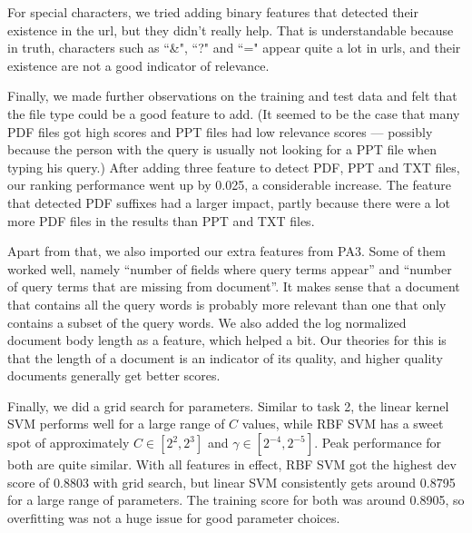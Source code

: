 \documentclass[10pt,twocolumn]{article}
\begin{document}
For special characters, we tried adding binary features that detected their existence in the url, but they didn't really help. That is understandable because in truth, characters such as ``\&", ``?" and ``=" appear quite a lot in urls, and their existence are not a good indicator of relevance.

Finally, we made further observations on the training and test data and felt that the file type could be a good feature to add. (It seemed to be the case that many PDF files got high scores and PPT files had low relevance scores --- possibly because the person with the query is usually not looking for a PPT file when typing his query.) After adding three feature to detect PDF, PPT and TXT files, our ranking performance went up by 0.025, a considerable increase. The feature that detected PDF suffixes had a larger impact, partly because there were a lot more PDF files in the results than PPT and TXT files.

Apart from that, we also imported our extra features from PA3. Some of them worked well, namely ``number of fields where query terms appear'' and ``number of query terms that are missing from document''. It makes sense that a document that contains all the query words is probably more relevant than one that only contains a subset of the query words. We also added the log normalized document body length as a feature, which helped a bit. Our theories for this is that the length of a document is an indicator of its quality, and higher quality documents generally get better scores.

Finally, we did a grid search for parameters. Similar to task 2, the linear kernel SVM performs well for a large range of $C$ values, while RBF SVM has a sweet spot of approximately $C\in[2^{2},2^{3}]$ and $\gamma\in[2^{-4},2^{-5}]$. Peak performance for both are quite similar. With all features in effect, RBF SVM got the highest dev score of 0.8803 with grid search, but linear SVM consistently gets around 0.8795 for a large range of parameters. The training score for both was around 0.8905, so overfitting was not a huge issue for good parameter choices.
\end{document}
